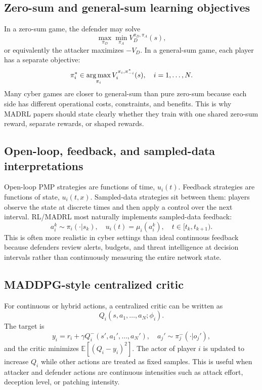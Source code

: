 \documentclass[11pt,a4paper]{article}
\begin{document}
\subsection{Zero-sum and general-sum learning objectives}
In a zero-sum game, the defender may solve
\begin{equation}
\max_{\pi_D}\min_{\pi_A} V_D^{\pi_D,\pi_A}(s),
\end{equation}
or equivalently the attacker maximizes $-V_D$. In a general-sum game, each player has a separate objective:
\begin{equation}
\pi_i^*\in \operatorname*{arg\,max}_{\pi_i} V_i^{\pi_i,\pi_{-i}^*}(s),\quad i=1,\ldots,N.
\end{equation}
Many cyber games are closer to general-sum than pure zero-sum because each side has different operational costs, constraints, and benefits. This is why MADRL papers should state clearly whether they train with one shared zero-sum reward, separate rewards, or shaped rewards.

\subsection{Open-loop, feedback, and sampled-data interpretations}
Open-loop PMP strategies are functions of time, $u_i(t)$. Feedback strategies are functions of state, $u_i(t,x)$. Sampled-data strategies sit between them: players observe the state at discrete times and then apply a control over the next interval. RL/MADRL most naturally implements sampled-data feedback:
\begin{equation}
a_i^k\sim \pi_i(\cdot|s_k),\quad u_i(t)=\mu_i(a_i^k),\quad t\in[t_k,t_{k+1}).
\end{equation}
This is often more realistic in cyber settings than ideal continuous feedback because defenders review alerts, budgets, and threat intelligence at decision intervals rather than continuously measuring the entire network state.

\subsection{MADDPG-style centralized critic}
For continuous or hybrid actions, a centralized critic can be written as
\begin{equation}
Q_i(s,a_1,\ldots,a_N;\phi_i).
\end{equation}
The target is
\begin{equation}
y_i=r_i+\gamma Q_i^-(s',a_1',\ldots,a_N'),\quad a_j'\sim \pi_j^-(\cdot|o_j'),
\end{equation}
and the critic minimizes $\mathbb{E}[(Q_i-y_i)^2]$. The actor of player $i$ is updated to increase $Q_i$ while other actions are treated as fixed samples. This is useful when attacker and defender actions are continuous intensities such as attack effort, deception level, or patching intensity.
\end{document}
